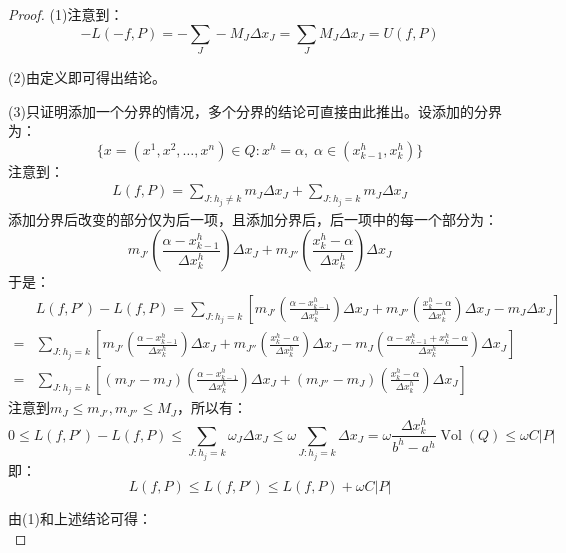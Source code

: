 \begin{proof}
	(1)注意到：
	\begin{equation*}
		-L(-f,P)=-\sum_{J}-M_J\Delta x_J=\sum_{J}M_J\Delta x_J=U(f,P)
	\end{equation*}\par
	(2)由定义即可得出结论。\par
	(3)只证明添加一个分界的情况，多个分界的结论可直接由此推出。设添加的分界为：
	\begin{equation*}
		\{x=(x^1,x^2,\dots,x^n)\in Q:x^h=\alpha,\;\alpha\in(x^h_{k-1},x^h_k)\}
	\end{equation*}
	注意到：
	\begin{align*}
		L(f,P)=\sum_{J:h_j\ne k}m_J\Delta x_J+\sum_{J:h_j=k}m_J\Delta x_J
	\end{align*}
	添加分界后改变的部分仅为后一项，且添加分界后，后一项中的每一个部分为：
	\begin{equation*}
		m_{J'}\left(\frac{\alpha-x^h_{k-1}}{\Delta x^h_k}\right)\Delta x_J+m_{J''}\left(\frac{x^h_k-\alpha}{\Delta x^h_k}\right)\Delta x_J
	\end{equation*}
	于是：
	\begin{align*}
		&L(f,P')-L(f,P)=\sum_{J:h_j=k}\left[m_{J'}\left(\frac{\alpha-x^h_{k-1}}{\Delta x^h_k}\right)\Delta x_J+m_{J''}\left(\frac{x^h_k-\alpha}{\Delta x^h_k}\right)\Delta x_J-m_J\Delta x_J\right] \\
		=&\sum_{J:h_j=k}\left[m_{J'}\left(\frac{\alpha-x^h_{k-1}}{\Delta x^h_k}\right)\Delta x_J+m_{J''}\left(\frac{x^h_k-\alpha}{\Delta x^h_k}\right)\Delta x_J-m_J\left(\frac{\alpha-x^h_{k-1}+x^h_k-\alpha}{\Delta x^h_k}\right)\Delta x_J\right] \\
		=&\sum_{J:h_j=k}\left[(m_{J'}-m_J)\left(\frac{\alpha-x^h_{k-1}}{\Delta x^h_k}\right)\Delta x_J+(m_{J''}-m_J)\left(\frac{x^h_k-\alpha}{\Delta x^h_k}\right)\Delta x_J\right]
	\end{align*}
	注意到$m_J\leqslant m_{J'},m_{J''}\leqslant M_J$，所以有：
	\begin{equation*}
		0\leqslant L(f,P')-L(f,P)\leqslant\sum_{J:h_j=k}\omega_J\Delta x_J\leqslant\omega\sum_{J:h_j=k}\Delta x_J=\omega\frac{\Delta x^h_k}{b^h-a^h}\operatorname{Vol}(Q)\leqslant\omega C|P|
	\end{equation*}
	即：
	\begin{equation*}
		L(f,P)\leqslant L(f,P')\leqslant L(f,P)+\omega C|P|
	\end{equation*}\par
	由(1)和上述结论可得：
	\begin{equation*}

\end{equation*}
\end{proof}
